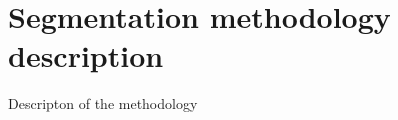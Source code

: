 \graphicspath{ {./content/method/figures/} }

\section{Segmentation methodology description} 
Descripton of the methodology

